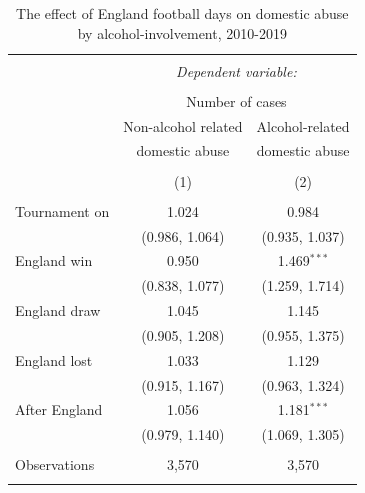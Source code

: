 \documentclass[12pt, a4paper]{article}
\begin{document}
\begin{table}[!htbp] \centering 
  \begin{threeparttable}
  \caption{The effect of England football days on domestic abuse by alcohol-involvement, 2010-2019} 
  \label{coremodel} 
\begin{tabular}{@{\extracolsep{5pt}}lcc} 
\\[-1.8ex]\hline 
\hline \\[-1.8ex] 
 & \multicolumn{2}{c}{\textit{Dependent variable:}} \\ 
\cline{2-3} 
\\[-1.8ex] & \multicolumn{2}{c}{Number of cases} \\ 
 & Non-alcohol related & Alcohol-related\\ 
 & domestic abuse & domestic abuse\\
\\[-1.8ex] & (1) & (2)\\ 
\hline \\[-1.8ex] 
 Tournament on & 1.024 & 0.984 \\ 
  & (0.986, 1.064) & (0.935, 1.037) \\ 
 England win & 0.950 & 1.469$^{***}$ \\ 
  & (0.838, 1.077) & (1.259, 1.714) \\ 
 England draw & 1.045 & 1.145 \\ 
  & (0.905, 1.208) & (0.955, 1.375) \\ 
 England lost & 1.033 & 1.129 \\ 
  & (0.915, 1.167) & (0.963, 1.324) \\ 
 After England & 1.056 & 1.181$^{***}$ \\ 
  & (0.979, 1.140) & (1.069, 1.305) \\ 
\hline \\[-1.8ex] 
Observations & 3,570 & 3,570 \\ 
\hline 
\hline \\[-1.8ex] 

\end{tabular}
\end{threeparttable}
\end{table}
\end{document}
